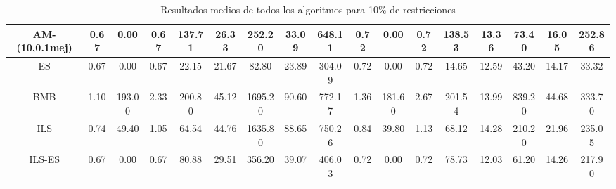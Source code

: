 \begin{table}[H]
{{\begin{tabular}{|| c || c c c c || c c c c || c c c c || c c c c ||}
        \hline
        AM-(10,0.1mej) & 0.67 & 0.00 & 0.67 & 137.71 & 26.33 & 252.20 & 33.09 & 648.11 & 0.72 & 0.00 & 0.72 & 138.53 & 13.36 & 73.40 & 16.05 & 252.86\\
        \hline
        \hline
        ES &
        0.67 & 0.00 & 0.67 & 22.15 & 21.67 & 82.80 & 23.89 & 304.09 & 0.72 & 0.00 & 0.72 & 14.65 & 12.59 & 43.20 & 14.17 & 33.32
        \\
        \hline
        BMB &
        1.10 & 193.00 & 2.33 & 200.80 & 45.12 & 1695.20 & 90.60 & 772.17 & 1.36 & 181.60 & 2.67 & 201.54 & 13.99 & 839.20 & 44.68 & 333.70
        \\
        \hline
        ILS &
        0.74 & 49.40 & 1.05 & 64.54 & 44.76 & 1635.80 & 88.65 & 750.26 & 0.84 & 39.80 & 1.13 & 68.12 & 14.28 & 210.20 & 21.96 & 235.05
        \\
        \hline
        ILS-ES &
        0.67 & 0.00 & 0.67 & 80.88 & 29.51 & 356.20 & 39.07 & 406.03 & 0.72 & 0.00 & 0.72 & 78.73 & 12.03 & 61.20 & 14.26 & 217.90
        \\
        \hline
    \end{tabular}
    }
    }
    \caption{Resultados medios de todos los algoritmos para 10\% de restricciones}
\end{table}

